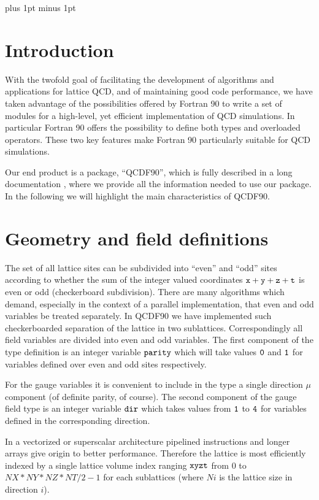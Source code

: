 \baselineskip 12pt plus 1pt minus 1pt
\setcounter{page}{1}


\section{Introduction}
\label{intro}

With the twofold goal of facilitating the development of algorithms
and applications for lattice QCD,
and of maintaining good code performance, we have taken advantage of
the possibilities offered by Fortran 90 to write a set of modules for
a high-level, yet efficient implementation of QCD simulations.
In particular Fortran 90 offers the possibility to
define both types and overloaded operators.
These two key features make Fortran 90 particularly suitable
for QCD simulations.

Our end product is a package, ``QCDF90'',
which is fully described in a long documentation \cite{QCDF90},
where we provide all the information needed to use our package.
In the following we will highlight the main 
characteristics of QCDF90.


\section{Geometry and field definitions }

The set of all lattice sites can be subdivided into ``even'' 
and ``odd'' sites according to whether the sum of the integer 
valued coordinates
$\tt x+y+z+t$ is even or odd (checkerboard subdivision). 
There are many algorithms which
demand, especially in the context of a parallel implementation, that
even and odd variables be treated separately.
In QCDF90 we have implemented such checkerboarded separation of 
the lattice in two sublattices. Correspondingly all field variables 
are divided into even and odd variables. 
The first component of the type definition is an 
integer variable $\tt parity$ which will take
values $\tt 0$ and $\tt 1$ for variables defined over even and odd 
sites respectively.

For the gauge variables it is convenient
to include in the type a single direction 
$\mu$ component (of definite parity, of course). 
The second component of the gauge field type is an integer 
variable $\tt dir$ which takes values from $\tt 1$ 
to $\tt 4$ for variables defined in the corresponding direction.
 
In a vectorized or superscalar architecture pipelined instructions 
and longer arrays give origin to better performance. 
Therefore the lattice is most efficiently indexed by 
a single lattice volume index ranging
$\tt xyzt$ from $0$ to $NX*NY*NZ*NT/2-1$ for each sublattices
(where $Ni$ is the lattice size in direction $i$).

